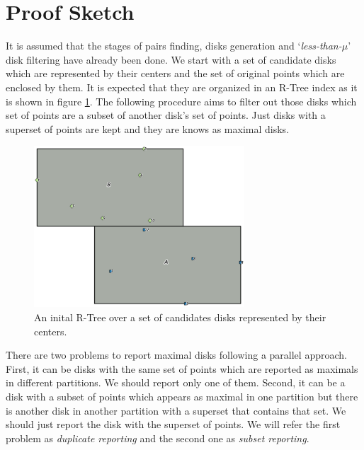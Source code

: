 \documentclass[12pt]{scrartcl}
\begin{document}
\renewcommand{\algorithmicrequire}{\textbf{Input:}}
\renewcommand{\algorithmicensure}{\textbf{Output:}}
\renewcommand{\algorithmicforall}{\textbf{for each}}

\section*{Proof Sketch}
It is assumed that the stages of pairs finding, disks generation and `\textit{less-than-$\mu$}' disk filtering have already been done. We start with a set of candidate disks which are represented by their centers and the set of original points which are enclosed by them.  It is expected that they are organized in an R-Tree index as it is shown in figure \ref{fig:r-tree}.  The following procedure aims to filter out those disks which set of points are a subset of another disk's set of points.  Just disks with a superset of points are kept and they are knows as maximal disks. 

\begin{figure}
  \centering
  \includegraphics[width=0.7\textwidth]{./Figures/r-tree}
  \caption{An inital R-Tree over a set of candidates disks represented by their centers.}
  \label{fig:r-tree}
\end{figure}

There are two problems to report maximal disks following a parallel approach. First, it can be disks with the same set of points which are reported as maximals in different partitions.  We should report only one of them.  Second, it can be a disk with a subset of points which appears as maximal in one partition but there is another disk in another partition with a superset that contains that set.   We should just report the disk with the superset of points.  We will refer the first problem as \textit{duplicate reporting} and the second one as \textit{subset reporting}.  
\end{document}
